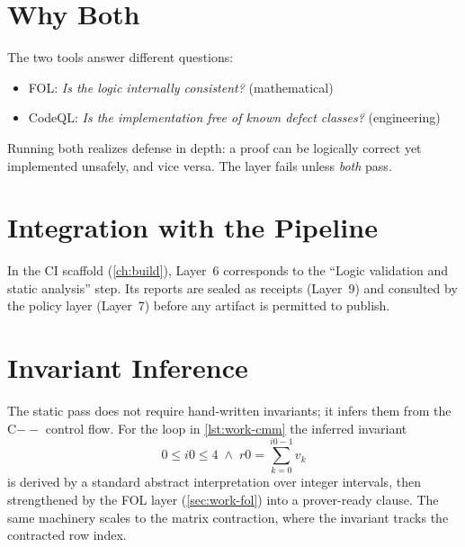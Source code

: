 \section{Why Both}
\label{sec:static-why}

The two tools answer different questions:
\begin{itemize}
  \item FOL: \emph{Is the logic internally consistent?} (mathematical)
  \item CodeQL: \emph{Is the implementation free of known defect classes?}
        (engineering)
\end{itemize}
Running both realizes defense in depth: a proof can be logically correct yet
implemented unsafely, and vice versa. The layer fails unless \emph{both} pass.

\section{Integration with the Pipeline}
\label{sec:static-int}

In the CI scaffold (\cref{ch:build}), Layer~6 corresponds to the
``Logic validation and static analysis'' step. Its reports are sealed as
receipts (Layer~9) and consulted by the policy layer (Layer~7) before any
artifact is permitted to publish.

\section{Invariant Inference}
\label{sec:static-infer}

The static pass does not require hand-written invariants; it infers them
from the C$--$ control flow. For the loop in \cref{lst:work-cmm} the
inferred invariant
\[
0 \le i0 \le 4 \;\wedge\; r0 = \sum_{k=0}^{i0-1} v_k
\]
is derived by a standard abstract interpretation over integer intervals,
then strengthened by the FOL layer (\cref{sec:work-fol}) into a
prover-ready clause. The same machinery scales to the matrix
contraction, where the invariant tracks the contracted row index.
